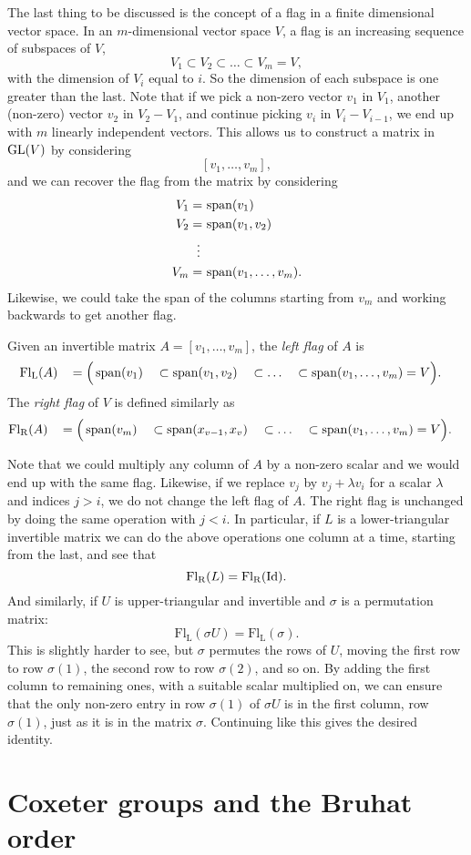 The last thing to be discussed is the concept of a flag in a finite
dimensional vector space. In an
$m$-dimensional vector space $V$, a flag is an increasing sequence of
subspaces of $V$,
\[ V_1 \subset V_2 \subset \dots \subset V_m = V, \]
with the dimension of $V_i$ equal to $i$. So the dimension of each
subspace is one greater than the last. Note that if we pick a non-zero
vector $v_1$ in $V_1$, another (non-zero) vector $v_2$ in $V_2 - V_1$,
and continue picking $v_i$ in $V_i - V_{i-1}$, we end up with $m$
linearly independent vectors. This allows us to construct a matrix in
$\operatorname{GL}(V)$ by considering
\[ [v_1,\dots,v_m], \]
and we can recover the flag from the matrix by considering
\begin{align*}
  V_1 =\, &\operatorname{span}(v_1) \\
  V_2 =\, &\operatorname{span}(v_1,v_2) \\
  \vdots\,\, & \\
  V_m =\, &\operatorname{span}(v_1,\dots,v_m).
\end{align*}
Likewise, we could take the span of the columns starting from $v_m$
and working backwards to get another flag.
\begin{definition}
  Given an invertible matrix $A = [v_1,\dots,v_m]$, the \textit{left
    flag} of $A$ is
  \begin{alignat*}{5}
    \mathrm{Fl_L}(A)\, &&= \Big(&\operatorname{span}(v_1) &&\subset \operatorname{span}(v_1,v_2)
    &&\subset \dots &&\subset \operatorname{span}(v_1,\dots,v_m) = V\Big).
  \end{alignat*}
  The \textit{right flag} of $V$ is defined similarly as
  \begin{alignat*}{5}
    \mathrm{Fl_R}(A)\, &&= \Big(&\operatorname{span}(v_m) &&\subset
    \operatorname{span}(x_{v-1},x_v) &&\subset \dots &&\subset
    \operatorname{span}(v_1,\dots,v_m) = V\Big). 
  \end{alignat*}
\end{definition}
Note that we could multiply any column of $A$ by a non-zero scalar and
we would end up with the same flag. Likewise, if we replace $v_j$ by
$v_j + \lambda v_i$ for a scalar $\lambda$ and indices $j > i$, we do not
change the left flag of $A$. The right flag is unchanged by doing
the same operation with $j < i$. In particular, if $L$ is a
lower-triangular invertible matrix we can do the above operations one
column at a time, starting from the last, and see that
\[ \mathrm{Fl_R}(L) = \mathrm{Fl_R}(\operatorname{Id}). \]
And similarly, if $U$ is upper-triangular and invertible and $\sigma$
is a permutation matrix:
\[ \mathrm{Fl_L}(\sigma U) = \mathrm{Fl_L}(\sigma). \]
This is slightly harder to see, but $\sigma$ permutes the rows of $U$,
moving the first row to row $\sigma(1)$, the second row to row
$\sigma(2)$, and so on. By adding the first column to remaining ones,
with a suitable scalar multiplied on, we can ensure that the only
non-zero entry in row $\sigma(1)$ of $\sigma U$ is in the first
column, row $\sigma(1)$, just as it is in the matrix
$\sigma$. Continuing like this gives the desired identity.

\section{Coxeter groups and the Bruhat order}


